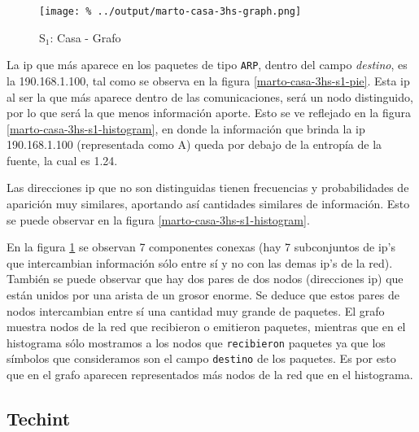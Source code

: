 \documentclass[final,inline,a4paper,narroweqnarray]{ieee}
\begin{document}
    \begin{figure}[ht]\begin{center}
      \texttt{[image: \%
      ../output/marto-casa-3hs-graph.png]}
      \vspace{-2em}
      \caption{S$_1$: Casa - Grafo}
      \label{marto-casa-3hs-graph}
    \end{center}\end{figure}	
  
  La ip que más aparece en los paquetes de tipo \texttt{ARP}, dentro del
  campo \textit{destino}, es la 190.168.1.100, tal como se observa en la
  figura \ref{marto-casa-3hs-s1-pie}. Esta ip al ser la que más aparece
  dentro de las comunicaciones, será un nodo distinguido, por lo que será la
  que menos información aporte. Esto se ve reflejado en la figura
  \ref{marto-casa-3hs-s1-histogram}, en donde la información que brinda la
  ip 190.168.1.100 (representada como A) queda por debajo de la entropía de
  la fuente, la cual es 1.24.  

  Las direcciones ip que no son distinguidas tienen frecuencias y
  probabilidades de aparición muy similares, aportando así
  cantidades similares de información. Esto se puede observar en la figura
  \ref{marto-casa-3hs-s1-histogram}.

  En la figura \ref{marto-casa-3hs-graph} se observan 7 componentes conexas
  (hay 7 subconjuntos de ip's que intercambian información sólo entre sí y
  no con las demas ip's de la red). También se puede observar que hay dos
  pares de dos
  nodos (direcciones ip) que están unidos por una arista de un grosor
  enorme. Se deduce que estos pares de  nodos intercambian entre sí una cantidad
  muy grande de paquetes.
  El grafo muestra nodos de la red que recibieron o emitieron paquetes,
  mientras que en el histograma sólo mostramos a los nodos que
  \texttt{recibieron} paquetes ya que los símbolos que consideramos son el
  campo \texttt{destino} de los paquetes. Es por esto que en el grafo
  aparecen representados más nodos de la red que en el histograma.  

  \subsection{Techint}
\end{document}
